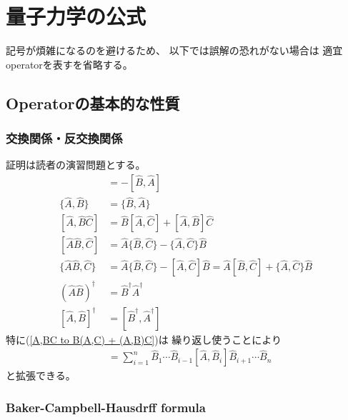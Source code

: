 \newpage
\section{量子力学の公式}

記号が煩雑になるのを避けるため、
以下では誤解の恐れがない場合は
適宜operatorを表す$\hat{}$を省略する。

\subsection{Operatorの基本的な性質}

\subsubsection{交換関係・反交換関係}

証明は読者の演習問題とする。
\begin{align}
    [\hat{A}, \hat{B}] &= - [\hat{B}, \hat{A}]
\\
    \{\hat{A}, \hat{B}\} &= \{\hat{B}, \hat{A}\}
\\
    [\hat{A}, \hat{B}\hat{C}]
   &=
   \hat{B}[\hat{A}, \hat{C}]
+
    [\hat{A}, \hat{B}] \hat{C}
\label{A,BC to B(A,C) + (A,B)C}
\\
    [\hat{A}\hat{B}, \hat{C}]
   &=
   \hat{A}\{\hat{B}, \hat{C}\}
-
    \{\hat{A}, \hat{C}\} \hat{B}
\\
    \{ \hat{A}\hat{B}, \hat{C} \}
   &=
   \hat{A}\{\hat{B}, \hat{C}\}
-
    [ \hat{A}, \hat{C} ] \hat{B}
=
   \hat{A} [ \hat{B}, \hat{C} ]
+
    \{\hat{A}, \hat{C}\} \hat{B}
\\
    \left(\hat{A}\hat{B}\right)^\dagger
    &=
    \hat{B}^\dagger\hat{A}^\dagger
\\
    [\hat{A}, \hat{B}]^\dagger
    &=
    [\hat{B}^\dagger, \hat{A}^\dagger]
\end{align}
特に(\ref{A,BC to B(A,C) + (A,B)C})は
繰り返し使うことにより
\begin{align}
    [\hat{A}, \hat{B}_1\hat{B}_2\cdots\hat{B}_n]
   &=
   \sum_{i=1}^n
   \hat{B}_1\cdots\hat{B}_{i-1}
   [\hat{A}, \hat{B}_i]
   \hat{B}_{i+1}\cdots\hat{B}_n
\end{align}
と拡張できる。

\subsubsection{Baker-Campbell-Hausdrff formula}

